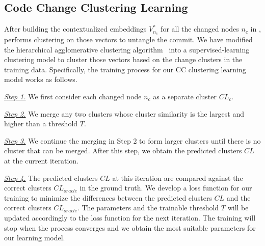 


\subsection{Code Change Clustering Learning}
\label{clustering:sec}

After building the contextualized embeddings $V^{*}_{n_c}$ for all the
changed nodes $n_c$ in {\mvpdg}, {\tool} performs clustering on those
vectors to untangle the commit. We have modified the hierarchical
agglomerative clustering algorithm~\cite{yi} into a
supervised-learning clustering model to cluster those vectors based on
the change clusters in the training data. Specifically, the training
process for our CC clustering learning model works as follows.

{\em \underline{Step 1.}} We first consider each changed node $n_c$ as a
separate cluster $CL_c$.

{\em \underline{Step 2.}} We merge any two clusters whose cluster
similarity is the largest and higher than a threshold $T$.

{\em \underline{Step 3.}} We continue the merging in Step 2 to form
larger clusters until there is no cluster that can be merged. After
this step, we obtain the predicted clusters $CL$ at the current
iteration.

{\em \underline{Step 4.}} The predicted clusters $CL$ at this iteration
are compared against the correct clusters $CL_{oracle}$ in the ground
truth. We develop a loss function for our training to minimize the
differences between the predicted clusters $CL$ and the correct
clusters $CL_{oracle}$. The parameters and the trainable threshold $T$
will be updated accordingly to the loss function for the next
iteration. The training will stop when the process converges and we
obtain the most suitable parameters for our learning model.

